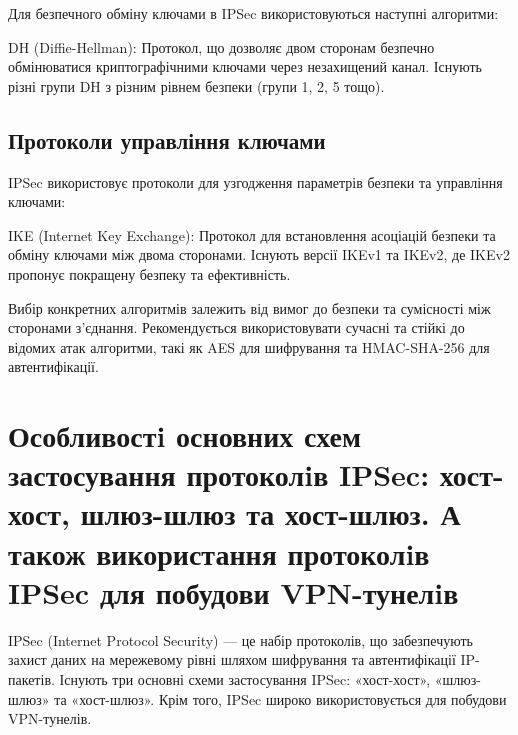 Для безпечного обміну ключами в IPSec використовуються наступні алгоритми:

DH (Diffie-Hellman): Протокол, що дозволяє двом сторонам безпечно обмінюватися криптографічними ключами через незахищений канал. Існують різні групи DH з різним рівнем безпеки (групи 1, 2, 5 тощо).

\subsection{Протоколи управління ключами}

IPSec використовує протоколи для узгодження параметрів безпеки та управління ключами:

IKE (Internet Key Exchange): Протокол для встановлення асоціацій безпеки та обміну ключами між двома сторонами. Існують версії IKEv1 та IKEv2, де IKEv2 пропонує покращену безпеку та ефективність.

Вибір конкретних алгоритмів залежить від вимог до безпеки та сумісності між сторонами з'єднання. Рекомендується використовувати сучасні та стійкі до відомих атак алгоритми, такі як AES для шифрування та HMAC-SHA-256 для автентифікації.

\section{Особливостi основних схем застосування протоколiв IPSec: хост-хост, шлюз-шлюз та хост-шлюз. А також використання протоколiв IPSec для побудови VPN-тунелiв}

IPSec (Internet Protocol Security) — це набір протоколів, що забезпечують захист даних на мережевому рівні шляхом шифрування та автентифікації IP-пакетів. Існують три основні схеми застосування IPSec: «хост-хост», «шлюз-шлюз» та «хост-шлюз». Крім того, IPSec широко використовується для побудови VPN-тунелів.

